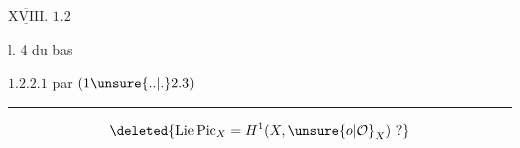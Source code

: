 
$\underline{\overline{\mathrm{XVIII}}}$. $1.2$



 l. 4 du bas

 $1.2.2.1$ par $(1\unsure{..|.}2.3)$

\smallskip\noindent\rule{.44\linewidth}{.35pt}

\[
\deleted{\mathrm{Lie}\,\mathrm{Pic}_{X}=H^{1}(X,\unsure{o|\mathcal O}_{X})\ ?}
\]

